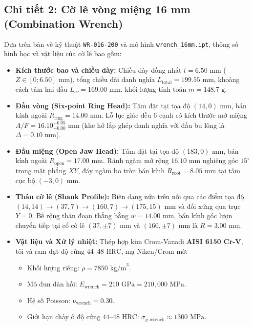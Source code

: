 \documentclass[12pt,a4paper]{article}
\begin{document}
\subsection{Chi tiết 2: Cờ lê vòng miệng 16 mm (Combination Wrench)}
Dựa trên bản vẽ kỹ thuật \texttt{WR-016-200} và mô hình \texttt{wrench\_16mm.ipt}, thông số hình học và vật liệu của cờ lê bao gồm:
\begin{itemize}
    \item \textbf{Kích thước bao và chiều dày:} Chiều dày đồng nhất $t = 6.50\text{ mm}$ ($Z \in [0; 6.50]\text{ mm}$), tổng chiều dài danh nghĩa $L_{\text{total}} = 199.55\text{ mm}$, khoảng cách tâm hai đầu $L_{cc} = 169.00\text{ mm}$, khối lượng tính toán $m = 148.7\text{ g}$.
    \item \textbf{Đầu vòng (Six-point Ring Head):} Tâm đặt tại tọa độ $(14, 0)\text{ mm}$, bán kính ngoài $R_{\text{ring}} = 14.00\text{ mm}$. Lỗ lục giác đều 6 cạnh có kích thước mở miệng $A/F = 16.10^{+0.05}_{-0.00}\text{ mm}$ (khe hở lắp ghép danh nghĩa với đầu bu lông là $\Delta = 0.10\text{ mm}$).
    \item \textbf{Đầu miệng (Open Jaw Head):} Tâm đặt tại tọa độ $(183, 0)\text{ mm}$, bán kính ngoài $R_{\text{open}} = 17.00\text{ mm}$. Rãnh ngàm mở rộng $16.10\text{ mm}$ nghiêng góc $15^\circ$ trong mặt phẳng $XY$, đáy ngàm bo tròn bán kính $R_{\text{root}} = 8.05\text{ mm}$ tại tâm cục bộ $(-3, 0)\text{ mm}$.
    \item \textbf{Thân cờ lê (Shank Profile):} Biên dạng nửa trên nối qua các điểm tọa độ $(14, 14) \rightarrow (37, 7) \rightarrow (160, 7) \rightarrow (175, 15)\text{ mm}$ và đối xứng qua trục $Y = 0$. Bề rộng thân đoạn thẳng bằng $w = 14.00\text{ mm}$, bán kính góc lượn chuyển tiếp tại cổ cờ lê $(37, \pm 7)\text{ mm}$ và $(160, \pm 7)\text{ mm}$ là $R = 3.00\text{ mm}$.
    \item \textbf{Vật liệu và Xử lý nhiệt:} Thép hợp kim Crom-Vanadi \textbf{AISI 6150 Cr-V}, tôi và ram đạt độ cứng $44\text{--}48\text{ HRC}$, mạ Niken/Crom mờ:
    \begin{itemize}
        \item Khối lượng riêng: $\rho = 7850\text{ kg/m}^3$.
        \item Mô đun đàn hồi: $E_{\text{wrench}} = 210\text{ GPa} = 210,000\text{ MPa}$.
        \item Hệ số Poisson: $\nu_{\text{wrench}} = 0.30$.
        \item Giới hạn chảy ở độ cứng $44\text{--}48\text{ HRC}$: $\sigma_{y,\text{wrench}} \approx 1300\text{ MPa}$.
    \end{itemize}
\end{itemize}
\end{document}
